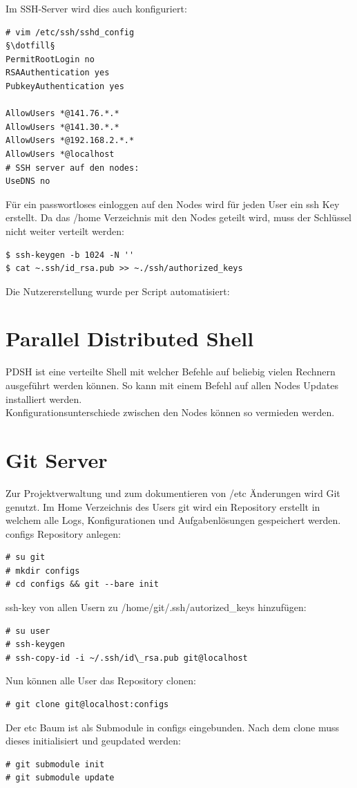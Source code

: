 Im SSH-Server wird dies auch konfiguriert:
\begin{lstlisting}[style=Bash]
# vim /etc/ssh/sshd_config
§\dotfill§
PermitRootLogin no
RSAAuthentication yes
PubkeyAuthentication yes

AllowUsers *@141.76.*.*
AllowUsers *@141.30.*.*
AllowUsers *@192.168.2.*.*
AllowUsers *@localhost
# SSH server auf den nodes:
UseDNS no
\end{lstlisting}
Für ein passwortloses einloggen auf den Nodes wird für jeden User ein ssh Key erstellt. Da das /home Verzeichnis mit den Nodes geteilt wird, muss der Schlüssel 
nicht weiter verteilt werden:
\begin{lstlisting}[style=Bash]
$ ssh-keygen -b 1024 -N ''
$ cat ~.ssh/id_rsa.pub >> ~./ssh/authorized_keys
\end{lstlisting}
Die Nutzererstellung wurde per Script automatisiert:

\section{Parallel Distributed Shell}
PDSH ist eine verteilte Shell mit welcher Befehle auf beliebig vielen Rechnern ausgeführt werden können. So kann mit einem Befehl auf allen Nodes
Updates installiert werden.\\
Konfigurationsunterschiede zwischen den Nodes können so vermieden werden.\\
\section{Git Server}
Zur Projektverwaltung und zum dokumentieren von /etc Änderungen wird Git genutzt.
Im Home Verzeichnis des Users git wird ein Repository erstellt in welchem alle Logs, Konfigurationen und Aufgabenlösungen gespeichert werden.\\
configs Repository anlegen:
\begin{lstlisting}[style=Bash]
# su git
# mkdir configs
# cd configs && git --bare init
\end{lstlisting}
ssh-key von allen Usern zu /home/git/.ssh/autorized\_keys hinzufügen:
\begin{lstlisting}[style=Bash]
# su user
# ssh-keygen
# ssh-copy-id -i ~/.ssh/id\_rsa.pub git@localhost
\end{lstlisting}
Nun können alle User das Repository clonen:\\
\begin{lstlisting}[style=Bash]
# git clone git@localhost:configs
\end{lstlisting}
Der etc Baum ist als Submodule in configs eingebunden. Nach dem clone muss dieses initialisiert und geupdated werden:
\begin{lstlisting}[style=Bash]
# git submodule init
# git submodule update
\end{lstlisting}
